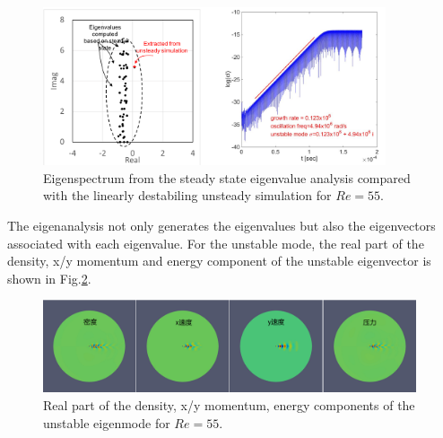 \documentclass[journal,final]{new-aiaa}
\begin{document}
\begin{figure}[htb]
	\centering   
	\includegraphics[width=0.9\textwidth]{pic/uns-vs-eigen.png}	
	\caption{Eigenspectrum from the steady state eigenvalue analysis
		compared with the linearly destabiling unsteady simulation for $Re=55$.}
	\label{fig:cyl-re55-eigen-vs-uns}
\end{figure}

The eigenanalysis not only generates the eigenvalues but also the eigenvectors
associated with each eigenvalue. For the unstable mode, the real part of the
density, x/y momentum and energy component of the unstable eigenvector
is shown in Fig.\ref{fig:cyl-re55-eigenmode}.
\begin{figure}[htb]
	\centering   
	\includegraphics[width=0.98\textwidth]{pic/eigenmode-real.png}	
	\caption{Real part of the density, x/y momentum, energy components
		of the unstable eigenmode for $Re=55$.}
	\label{fig:cyl-re55-eigenmode}
\end{figure}
\end{document}
